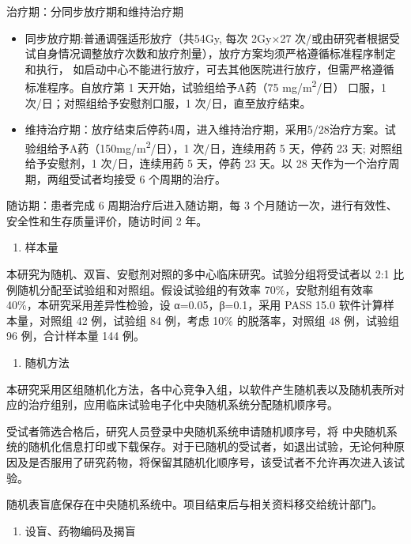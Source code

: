 \documentclass[
  chinese-hans,
  letterpaper,
  DIV=11,
  numbers=noendperiod]{scrreprt}
\providecommand{\tightlist}{%
  \setlength{\itemsep}{0pt}\setlength{\parskip}{0pt}}
\begin{document}
治疗期：分同步放疗期和维持治疗期

\begin{itemize}
\item
  同步放疗期:普通调强适形放疗（共54Gy, 每次 2Gy×27
  次/或由研究者根据受试自身情况调整放疗次数和放疗剂量），放疗方案均须严格遵循标准程序制定和执行，
  如启动中心不能进行放疗，可去其他医院进行放疗，但需严格遵循标准程序。自放疗第
  1 天开始，试验组给予A药（75 mg/m\textsuperscript{2}/日） 口服，1
  次/日；对照组给予安慰剂口服，1 次/日，直至放疗结束。
\item
  维持治疗期：放疗结束后停药4周，进入维持治疗期，采用5/28治疗方案。试验组给予A药（150mg/m\textsuperscript{2}/日），1
  次/日，连续用药 5 天，停药 23 天; 对照组给予安慰剂，1 次/日，连续用药
  5 天，停药 23 天。以 28 天作为一个治疗周期，两组受试者均接受 6
  个周期的治疗。
\end{itemize}

随访期：患者完成 6 周期治疗后进入随访期，每 3
个月随访一次，进行有效性、安全性和生存质量评价，随访时间 2 年。

\begin{enumerate}
\def\labelenumi{\arabic{enumi}.}
\setcounter{enumi}{1}
\tightlist
\item
  样本量
\end{enumerate}

本研究为随机、双盲、安慰剂对照的多中心临床研究。试验分组将受试者以 2:1
比例随机分配至试验组和对照组。假设试验组的有效率 70\%，安慰剂组有效率
40\%，本研究采用差异性检验，设 α=0.05，β=0.1，采用 PASS 15.0
软件计算样本量，对照组 42 例，试验组 84 例，考虑 10\% 的脱落率，对照组
48 例，试验组 96 例，合计样本量 144 例。

\begin{enumerate}
\def\labelenumi{\arabic{enumi}.}
\setcounter{enumi}{2}
\tightlist
\item
  随机方法
\end{enumerate}

本研究采用区组随机化方法，各中心竞争入组，以软件产生随机表以及随机表所对应的治疗组别，应用临床试验电子化中央随机系统分配随机顺序号。

受试者筛选合格后，研究人员登录中央随机系统申请随机顺序号，将
中央随机系统的随机化信息打印或下载保存。对于已随机的受试者，如退出试验，无论何种原因及是否服用了研究药物，将保留其随机化顺序号，该受试者不允许再次进入该试验。

随机表盲底保存在中央随机系统中。项目结束后与相关资料移交给统计部门。

\begin{enumerate}
\def\labelenumi{\arabic{enumi}.}
\setcounter{enumi}{3}
\tightlist
\item
  设盲、药物编码及揭盲
\end{enumerate}
\end{document}
